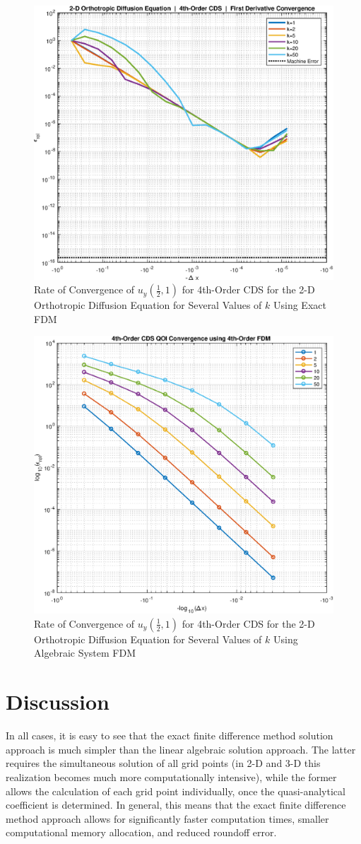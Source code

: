 \documentclass[10pt]{article}		%
\numberwithin{equation}{section}
\begin{document}
\begin{figure}[H]
	\begin{center}
		\includegraphics[width = 0.5\linewidth]{2ddiff4oconv}
		\caption{Rate of Convergence of $u_y(\tfrac{1}{2},1)$ for 4th-Order CDS for the 2-D Orthotropic Diffusion Equation for Several Values of $k$ Using Exact FDM}	
	\end{center}
\end{figure}

\begin{figure}[H]
	\begin{center}
		\includegraphics[width = 0.5\linewidth]{order_4_u_y_fdm}
		\caption{Rate of Convergence of $u_y(\tfrac{1}{2},1)$ for 4th-Order CDS for the 2-D Orthotropic Diffusion Equation for Several Values of $k$ Using Algebraic System FDM}	
	\end{center}
\end{figure}

\newpage

\section{Discussion}

In all cases, it is easy to see that the exact finite difference method solution approach is much simpler than the linear algebraic solution approach. The latter requires the simultaneous solution of all grid points (in 2-D and 3-D this realization becomes much more computationally intensive), while the former allows the calculation of each grid point individually, once the quasi-analytical coefficient is determined. In general, this means that the exact finite difference method approach allows for significantly faster computation times, smaller computational memory allocation, and reduced roundoff error.
\end{document}
